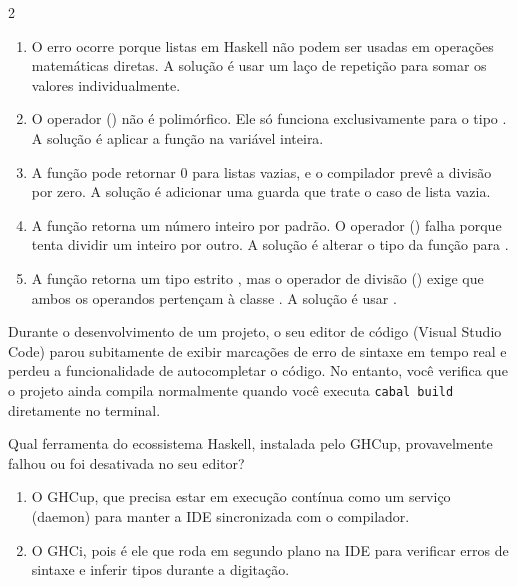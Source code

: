 \documentclass[a4paper,10pt,brazil]{article}
\begin{document}
\begin{multicols}{2}
\begin{enumerate}
  \item O erro ocorre porque listas em Haskell não podem ser usadas em operações matemáticas diretas. A solução é usar um laço de repetição  para somar os valores individualmente.

  \item O operador (\haskellinline{/}) não é polimórfico. Ele só funciona exclusivamente para o tipo . A solução é aplicar a função  na variável  inteira.

  \item A função  pode retornar 0 para listas vazias, e o compilador prevê a divisão por zero. A solução é adicionar uma guarda que trate o caso de lista vazia.

  \item A função  retorna um número inteiro por padrão. O operador (\haskellinline{/}) falha porque tenta dividir um inteiro por outro. A solução é alterar o tipo da função para .

  \item A função  retorna um tipo estrito , mas o operador de divisão (\haskellinline{/}) exige que ambos os operandos pertençam à classe . A solução é usar .


\end{enumerate}

Durante o desenvolvimento de um projeto, o seu editor de código (Visual Studio Code) parou subitamente de exibir marcações de erro de sintaxe em tempo real e perdeu a funcionalidade de autocompletar o código. No entanto, você verifica que o projeto ainda compila normalmente quando você executa \texttt{cabal build} diretamente no terminal. 

Qual ferramenta do ecossistema Haskell, instalada pelo GHCup, provavelmente falhou ou foi desativada no seu editor?

\begin{enumerate}
  \item O GHCup, que precisa estar em execução contínua como um serviço (daemon) para manter a IDE sincronizada com o compilador.

  \item O GHCi, pois é ele que roda em segundo plano na IDE para verificar erros de sintaxe e inferir tipos durante a digitação.


\end{enumerate}
\end{multicols}
\end{document}
